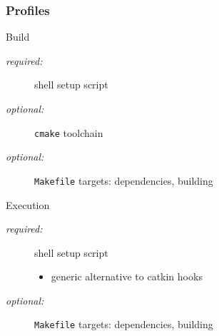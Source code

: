 \documentclass[hyperref={colorlinks=false, breaklinks=true},11pt]{beamer}
\begin{document}
\begin{frame}
    \frametitle{Profiles}

    \begin{block}{Build}
        \begin{description}
            \item[\it{required:}] shell setup script
            \item[\it{optional:}] \texttt{cmake} toolchain
            \item[\it{optional:}] \texttt{Makefile} targets: dependencies, building
        \end{description}
    \end{block}

    \begin{block}{Execution}
        \begin{description}
            \item[\it{required:}] shell setup script
                \begin{itemize}
                    \item generic alternative to catkin hooks
                \end{itemize}
            \item[\it{optional:}] \texttt{Makefile} targets: dependencies, building
        \end{description}
    \end{block}
\end{frame}
\end{document}
